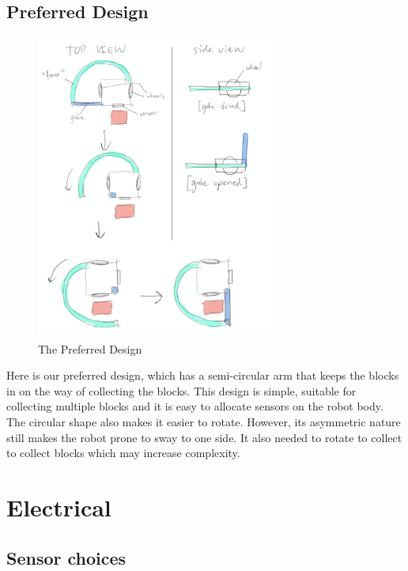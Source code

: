 \subsection{Preferred Design}


\begin{figure}[H]
    \centering
    \includegraphics[width=8cm]{Design3}
    \caption{The Preferred Design}
    \label{}
\end{figure}


Here is our preferred design, which has a semi-circular arm that keeps the blocks in on the way of collecting the blocks. This design is simple, suitable for collecting multiple blocks and it is easy to allocate sensors on the robot body. The circular shape also makes it easier to rotate. However, its asymmetric nature still makes the robot prone to sway to one side. It also needed to rotate to collect to collect blocks which may increase complexity.









\section{Electrical}

\subsection{Sensor choices}


